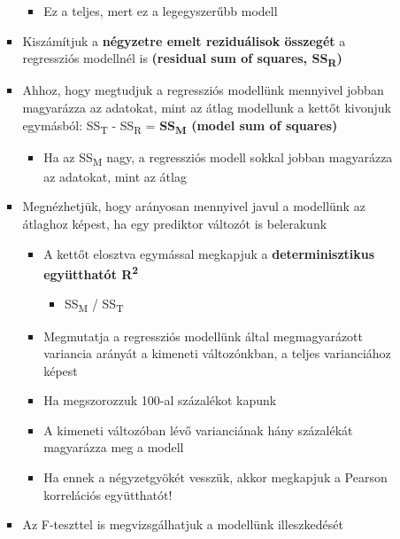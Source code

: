 \documentclass[
  letterpaper,
  DIV=11,
  numbers=noendperiod]{scrreprt}
\providecommand{\tightlist}{%
  \setlength{\itemsep}{0pt}\setlength{\parskip}{0pt}}\usepackage{longtable,booktabs,array}
\begin{document}
\begin{itemize}
\begin{itemize}
\begin{itemize}
      \begin{itemize}
      \tightlist
      \item
        Ez a teljes, mert ez a legegyszerűbb modell
      \end{itemize}
    \item
      Kiszámítjuk a \textbf{négyzetre emelt reziduálisok összegét} a
      regressziós modellnél is \textbf{(residual sum of squares,
      SS\textsubscript{R})}
    \item
      Ahhoz, hogy megtudjuk a regressziós modellünk mennyivel jobban
      magyarázza az adatokat, mint az átlag modellunk a kettőt kivonjuk
      egymásból: SS\textsubscript{T} - SS\textsubscript{R} =
      \textbf{SS\textsubscript{M} (model sum of squares)}

      \begin{itemize}
      \tightlist
      \item
        Ha az SS\textsubscript{M} nagy, a regressziós modell sokkal
        jobban magyarázza az adatokat, mint az átlag
      \end{itemize}
    \item
      Megnézhetjük, hogy arányosan mennyivel javul a modellünk az
      átlaghoz képest, ha egy prediktor változót is belerakunk

      \begin{itemize}
      \item
        A kettőt elosztva egymással megkapjuk a \textbf{determinisztikus
        együtthatót R\textsuperscript{2}}

        \begin{itemize}
        \tightlist
        \item
          SS\textsubscript{M} / SS\textsubscript{T}
        \end{itemize}
      \item
        Megmutatja a regressziós modellünk által megmagyarázott
        variancia arányát a kimeneti változónkban, a teljes varianciához
        képest
      \item
        Ha megszorozzuk 100-al százalékot kapunk
      \item
        A kimeneti változóban lévő varianciának hány százalékát
        magyarázza meg a modell
      \item
        Ha ennek a négyzetgyökét vesszük, akkor megkapjuk a Pearson
        korrelációs együtthatót!
      \end{itemize}
    \item
      Az F-teszttel is megvizsgálhatjuk a modellünk illeszkedését


\end{itemize}
\end{itemize}
\end{itemize}
\end{document}
